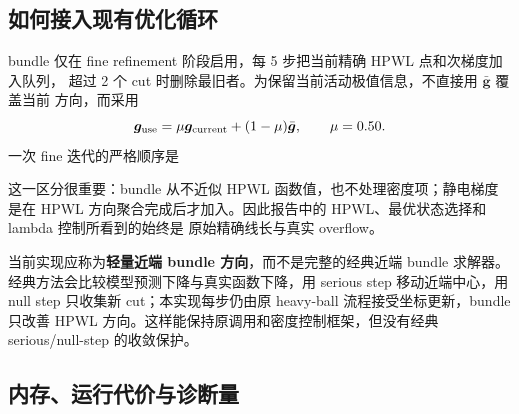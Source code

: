 \documentclass[UTF8,fontset=windows,a4paper,11pt]{ctexart}
\begin{document}
\subsection{如何接入现有优化循环}

bundle 仅在 fine refinement 阶段启用，每 5 步把当前精确 HPWL 点和次梯度加入队列，
超过 2 个 cut 时删除最旧者。为保留当前活动极值信息，不直接用 $\bar{\bm g}$ 覆盖当前
方向，而采用
\begin{equation}
 \bm g_{\rm use}=\mu\bm g_{\rm current}+(1-\mu)\bar{\bm g},
 \qquad \mu=0.50.
 \label{eq:bundle-mix}
\end{equation}
一次 fine 迭代的严格顺序是
\begin{center}
\end{center}
这一区分很重要：bundle 从不近似 HPWL 函数值，也不处理密度项；静电梯度是在 HPWL
方向聚合完成后才加入。因此报告中的 HPWL、最优状态选择和 lambda 控制所看到的始终是
原始精确线长与真实 overflow。

当前实现应称为\textbf{轻量近端 bundle 方向}，而不是完整的经典近端 bundle 求解器。
经典方法会比较模型预测下降与真实函数下降，用 serious step 移动近端中心，用 null step
只收集新 cut；本实现每步仍由原 heavy-ball 流程接受坐标更新，bundle 只改善 HPWL
方向。这样能保持原调用和密度控制框架，但没有经典 serious/null-step 的收敛保护。

\subsection{内存、运行代价与诊断量}
\end{document}
